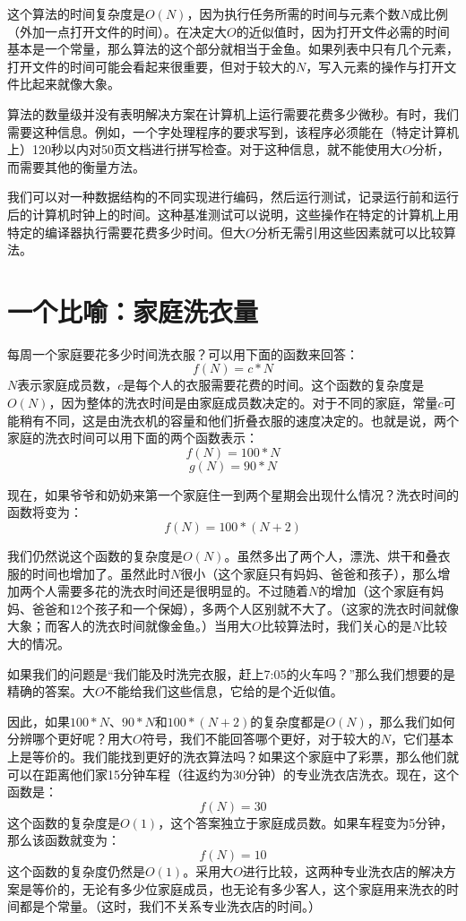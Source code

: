 这个算法的时间复杂度是$O(N)$，因为执行任务所需的时间与元素个数$N$成比例（外加一点打开文件的时间）。在决定大$O$的近似值时，因为打开文件必需的时间基本是一个常量，那么算法的这个部分就相当于金鱼。如果列表中只有几个元素，打开文件的时间可能会看起来很重要，但对于较大的$N$，写入元素的操作与打开文件比起来就像大象。

算法的数量级并没有表明解决方案在计算机上运行需要花费多少微秒。有时，我们需要这种信息。例如，一个字处理程序的要求写到，该程序必须能在（特定计算机上）120秒以内对50页文档进行拼写检查。对于这种信息，就不能使用大$O$分析，而需要其他的衡量方法。

我们可以对一种数据结构的不同实现进行编码，然后运行测试，记录运行前和运行后的计算机时钟上的时间。这种基准测试可以说明，这些操作在特定的计算机上用特定的编译器执行需要花费多少时间。但大$O$分析无需引用这些因素就可以比较算法。

\section{一个比喻：家庭洗衣量}

每周一个家庭要花多少时间洗衣服？可以用下面的函数来回答：
\[f(N)=c*N\]
$N$表示家庭成员数，$c$是每个人的衣服需要花费的时间。这个函数的复杂度是$O(N)$，因为整体的洗衣时间是由家庭成员数决定的。对于不同的家庭，常量$c$可能稍有不同，这是由洗衣机的容量和他们折叠衣服的速度决定的。也就是说，两个家庭的洗衣时间可以用下面的两个函数表示：
\[f(N)=100*N\]
\[g(N)=90*N \]

现在，如果爷爷和奶奶来第一个家庭住一到两个星期会出现什么情况？洗衣时间的函数将变为：
\[f(N)=100*(N+2)\]

我们仍然说这个函数的复杂度是$O(N)$。虽然多出了两个人，漂洗、烘干和叠衣服的时间也增加了。虽然此时$N$很小（这个家庭只有妈妈、爸爸和孩子），那么增加两个人需要多花的洗衣时间还是很明显的。不过随着$N$的增加（这个家庭有妈妈、爸爸和12个孩子和一个保姆），多两个人区别就不大了。（这家的洗衣时间就像大象；而客人的洗衣时间就像金鱼。）当用大$O$比较算法时，我们关心的是$N$比较大的情况。

如果我们的问题是“我们能及时洗完衣服，赶上7:05的火车吗？”那么我们想要的是精确的答案。大$O$不能给我们这些信息，它给的是个近似值。

因此，如果$100*N$、$90*N$和$100*(N+2)$的复杂度都是$O(N)$，那么我们如何分辨哪个更好呢？用大$O$符号，我们不能回答哪个更好，对于较大的$N$，它们基本上是等价的。我们能找到更好的洗衣算法吗？如果这个家庭中了彩票，那么他们就可以在距离他们家15分钟车程（往返约为30分钟）的专业洗衣店洗衣。现在，这个函数是：
\[f(N)=30\]
这个函数的复杂度是$O(1)$，这个答案独立于家庭成员数。如果车程变为5分钟，那么该函数就变为：
\[f(N)=10\]
这个函数的复杂度仍然是$O(1)$。采用大$O$进行比较，这两种专业洗衣店的解决方案是等价的，无论有多少位家庭成员，也无论有多少客人，这个家庭用来洗衣的时间都是个常量。（这时，我们不关系专业洗衣店的时间。）


